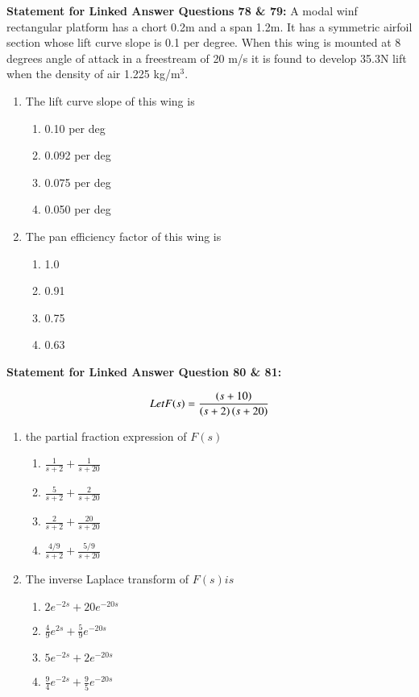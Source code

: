 \documentclass[journal]{IEEEtran}
\begin{document}
\textbf{Statement for Linked Answer Questions 78 \& 79:} A modal winf rectangular platform has a chort 0.2m and a span 1.2m. It has a symmetric airfoil section whose lift curve slope is 0.1 per degree. When this wing is mounted at 8 degrees angle of attack in a freestream of 20 m/s it is found to develop 35.3N lift when the density of air 1.225 kg/m$^3$.

\begin{enumerate}
    \item The lift curve slope of this wing is
        \begin{enumerate}
            \item 0.10 per deg
            \item 0.092 per deg
            \item 0.075 per deg
            \item 0.050 per deg
        \end{enumerate}
    \item The pan efficiency factor of this wing is
        \begin{enumerate}
            \item 1.0
            \item 0.91
            \item 0.75
            \item 0.63
        \end{enumerate}
\end{enumerate}

\textbf{Statement for Linked Answer Question 80 \& 81:}

$$Let F(s) = \frac{\left(s+10\right)}{\left(s+2\right)\left(s+20\right)}$$

\begin{enumerate}
    \item the partial fraction expression of $F(s)$
        \begin{enumerate}
            \item $\displaystyle\frac{1}{s+2}+\frac{1}{s+20}$
            \item $\displaystyle\frac{5}{s+2}+\frac{2}{s+20}$
            \item $\displaystyle\frac{2}{s+2}+\frac{20}{s+20}$
            \item $\displaystyle\frac{4/9}{s+2}+\frac{5/9}{s+20}$
        \end{enumerate}
    \item The inverse Laplace transform of $F(s) is$
        \begin{enumerate}
            \item $\displaystyle2e^{-2s}+20e^{-20s}$
            \item $\displaystyle\frac{4}{9}e^{2s}+\frac{5}{9}e^{-20s}$
            \item $5e^{-2s}+2e^{-20s}$
            \item $\frac{9}{4}e^{-2s}+\frac{9}{5}e^{-20s}$
        \end{enumerate}
\end{enumerate}
\end{document}
